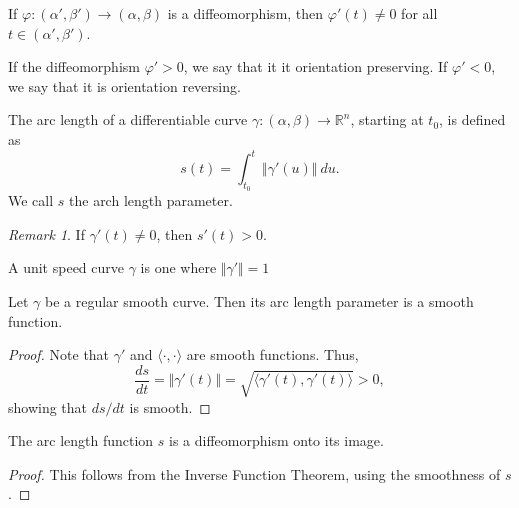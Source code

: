 \documentclass[11pt]{article}
\newcommand{\R}{\mathbb{R}}
\newcommand{\ip}[2]{\langle #1, #2 \rangle}
\newcommand{\norm}[1]{\Vert #1 \Vert}
\newcommand{\dd}[2]{\frac{d #1}{d #2}}
\theoremstyle{definition}
\theoremstyle{remark}
\newtheorem*{remark}{Remark}
\numberwithin{equation}{section}
\begin{document}
    \begin{lemma}
        If $\varphi\colon (\alpha', \beta') \to (\alpha, \beta)$ is a diffeomorphism,
        then $\varphi'(t) \neq 0$ for all $t \in (\alpha', \beta')$.
    \end{lemma}

    \begin{definition}
        If the diffeomorphism $\varphi' > 0$, we say that it it orientation
        preserving. If $\varphi' < 0$, we say that it is orientation reversing.
    \end{definition}

    \begin{definition}
        The arc length of a differentiable curve $\gamma\colon (\alpha, \beta) \to
        \R^n$, starting at $t_0$, is defined as \[
            s(t) = \int_{t_0}^t \norm{\gamma'(u)}\:du.
        \] We call $s$ the arch length parameter.

        \begin{remark}
            If $\gamma'(t) \neq 0$, then $s'(t) > 0$.
        \end{remark}
    \end{definition}

    \begin{definition}
        A unit speed curve $\gamma$ is one where $\norm{\gamma'} = 1$
    \end{definition}

    \begin{lemma}
        Let $\gamma$ be a regular smooth curve. Then its arc length parameter is a
        smooth function.
    \end{lemma}
    \begin{proof}
        Note that $\gamma'$ and $\ip{\cdot}{\cdot}$ are smooth functions. Thus, \[
            \dd{s}{t} = \norm{\gamma'(t)} = \sqrt{\ip{\gamma'(t)}{\gamma'(t)}} > 0,
        \] showing that $ds / dt$ is smooth.
    \end{proof}

    \begin{lemma}
        The arc length function $s$ is a diffeomorphism onto its image.
    \end{lemma}
    \begin{proof}
        This follows from the Inverse Function Theorem, using the smoothness of $s$.
    \end{proof}
\end{document}
